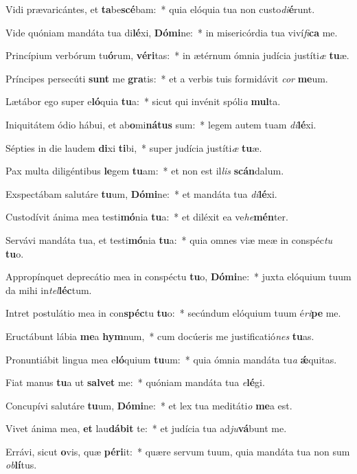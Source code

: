 \item Vidi prævaricántes, et \textbf{ta}be\textbf{scé}bam:~* quia elóquia tua non custo\textit{di}\textbf{é}runt.
\item Vide quóniam mandáta tua di\textbf{lé}xi, \textbf{Dó}\textbf{mi}ne:~* in misericórdia tua viví\textit{fi}\textbf{ca} me.
\item Princípium verbórum tu\textbf{ó}rum, \textbf{vé}\textbf{ri}tas:~* in ætérnum ómnia judícia justíti\textit{æ} \textbf{tu}æ.
\item Príncipes persecúti \textbf{sunt} me \textbf{gra}tis:~* et a verbis tuis formidávit \textit{cor} \textbf{me}um.
\item Lætábor ego super e\textbf{ló}quia \textbf{tu}a:~* sicut qui invénit spóli\textit{a} \textbf{mul}ta.
\item Iniquitátem ódio hábui, et ab\textbf{o}mi\textbf{ná}\textbf{tus} sum:~* legem autem tuam \textit{di}\textbf{lé}xi.
\item Sépties in die laudem \textbf{di}xi \textbf{ti}bi,~* super judícia justíti\textit{æ} \textbf{tu}æ.
\item Pax multa diligéntibus \textbf{le}gem \textbf{tu}am:~* et non est il\textit{lis} \textbf{scán}dalum.
\item Exspectábam salutáre \textbf{tu}um, \textbf{Dó}\textbf{mi}ne:~* et mandáta tua \textit{di}\textbf{lé}xi.
\item Custodívit ánima mea testi\textbf{mó}nia \textbf{tu}a:~* et diléxit ea ve\textit{he}\textbf{mén}ter.
\item Servávi mandáta tua, et testi\textbf{mó}nia \textbf{tu}a:~* quia omnes viæ meæ in conspéc\textit{tu} \textbf{tu}o.
\item Appropínquet deprecátio mea in conspéctu \textbf{tu}o, \textbf{Dó}\textbf{mi}ne:~* juxta elóquium tuum da mihi in\textit{tel}\textbf{léc}tum.
\item Intret postulátio mea in con\textbf{spéc}tu \textbf{tu}o:~* secúndum elóquium tuum é\textit{ri}\textbf{pe} me.
\item Eructábunt lábia \textbf{me}a \textbf{hym}num,~* cum docúeris me justificatió\textit{nes} \textbf{tu}as.
\item Pronuntiábit lingua mea e\textbf{ló}quium \textbf{tu}um:~* quia ómnia mandáta tu\textit{a} \textbf{ǽ}quitas.
\item Fiat manus \textbf{tu}a ut \textbf{sal}\textbf{vet} me:~* quóniam mandáta tua \textit{e}\textbf{lé}gi.
\item Concupívi salutáre \textbf{tu}um, \textbf{Dó}\textbf{mi}ne:~* et lex tua meditáti\textit{o} \textbf{me}a est.
\item Vivet ánima mea, \textbf{et} lau\textbf{dá}\textbf{bit} te:~* et judícia tua ad\textit{ju}\textbf{vá}bunt me.
\item Errávi, sicut \textbf{o}vis, quæ \textbf{pér}\textbf{i}it:~* quære servum tuum, quia mandáta tua non sum \textit{ob}\textbf{lí}tus.
